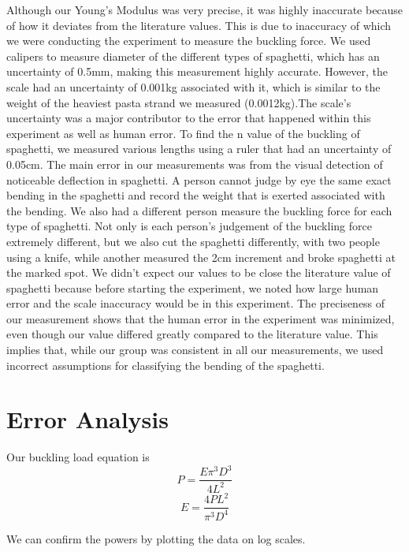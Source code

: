 \documentclass[12pt]{article}
\begin{document}
Although our Young's Modulus was very precise, it was highly inaccurate because of how it deviates from the literature values. This is due to inaccuracy of which we were conducting the experiment to measure the buckling force. We used calipers to measure diameter of the different types of spaghetti, which has an uncertainty of 0.5mm, making this measurement highly accurate. However, the scale had an uncertainty of 0.001kg associated with it, which is similar to the weight of the heaviest pasta strand we measured (0.0012kg).The scale's uncertainty was a major contributor to the error that happened within this experiment as well as human error.  To find the n value of the buckling of spaghetti, we measured various lengths using a ruler that had an uncertainty of 0.05cm. The main error in our measurements was from the visual detection of noticeable deflection in spaghetti. A person cannot judge by eye the same exact bending in the spaghetti and record the weight that is exerted associated with the bending. We also had a different person measure the buckling force for each type of spaghetti. Not only is each person’s judgement of the buckling force extremely different, but we also cut the spaghetti differently, with two people using a knife, while another measured the 2cm increment and broke spaghetti at the marked spot. We didn't expect our values to be close the literature value of spaghetti because before starting the experiment, we noted how large human error and the scale inaccuracy would be in this experiment. The preciseness of our measurement shows that the human error in the experiment was minimized, even though our value differed greatly compared to the literature value. This implies that, while our group was consistent in all our measurements, we used incorrect assumptions for classifying the bending of the spaghetti.

\section{Error Analysis}

Our buckling load equation is
$$P = \frac{E\pi ^3D^3}{4L^2}$$
$$E = \frac{4PL^2}{\pi ^3D^4}$$

We can confirm the powers by plotting the data on log scales.
\end{document}
